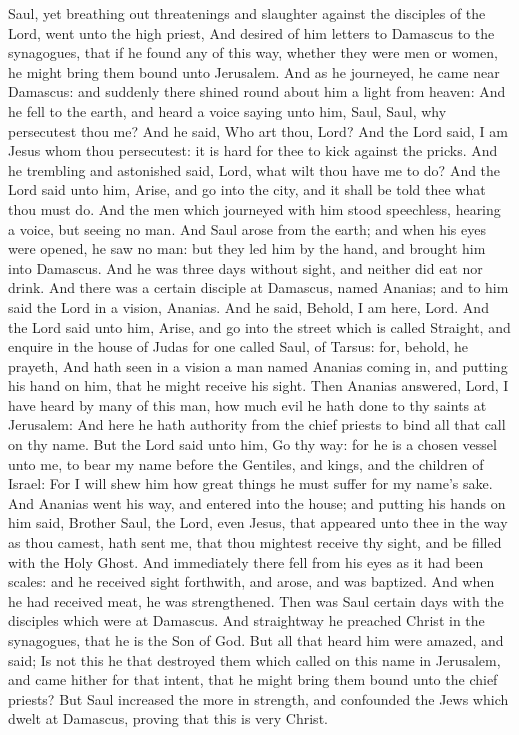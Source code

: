  Saul, yet breathing out threatenings and slaughter against the disciples of the Lord, went unto the high priest, And desired of him letters to Damascus to the synagogues, that if he found any of this way, whether they were men or women, he might bring them bound unto Jerusalem. And as he journeyed, he came near Damascus: and suddenly there shined round about him a light from heaven: And he fell to the earth, and heard a voice saying unto him, Saul, Saul, why persecutest thou me? And he said, Who art thou, Lord? And the Lord said, I am Jesus whom thou persecutest: it is hard for thee to kick against the pricks. And he trembling and astonished said, Lord, what wilt thou have me to do? And the Lord said unto him, Arise, and go into the city, and it shall be told thee what thou must do. And the men which journeyed with him stood speechless, hearing a voice, but seeing no man. And Saul arose from the earth; and when his eyes were opened, he saw no man: but they led him by the hand, and brought him into Damascus. And he was three days without sight, and neither did eat nor drink. And there was a certain disciple at Damascus, named Ananias; and to him said the Lord in a vision, Ananias. And he said, Behold, I am here, Lord. And the Lord said unto him, Arise, and go into the street which is called Straight, and enquire in the house of Judas for one called Saul, of Tarsus: for, behold, he prayeth, And hath seen in a vision a man named Ananias coming in, and putting his hand on him, that he might receive his sight. Then Ananias answered, Lord, I have heard by many of this man, how much evil he hath done to thy saints at Jerusalem: And here he hath authority from the chief priests to bind all that call on thy name. But the Lord said unto him, Go thy way: for he is a chosen vessel unto me, to bear my name before the Gentiles, and kings, and the children of Israel: For I will shew him how great things he must suffer for my name's sake. And Ananias went his way, and entered into the house; and putting his hands on him said, Brother Saul, the Lord, even Jesus, that appeared unto thee in the way as thou camest, hath sent me, that thou mightest receive thy sight, and be filled with the Holy Ghost. And immediately there fell from his eyes as it had been scales: and he received sight forthwith, and arose, and was baptized. And when he had received meat, he was strengthened. Then was Saul certain days with the disciples which were at Damascus. And straightway he preached Christ in the synagogues, that he is the Son of God. But all that heard him were amazed, and said; Is not this he that destroyed them which called on this name in Jerusalem, and came hither for that intent, that he might bring them bound unto the chief priests? But Saul increased the more in strength, and confounded the Jews which dwelt at Damascus, proving that this is very Christ.
